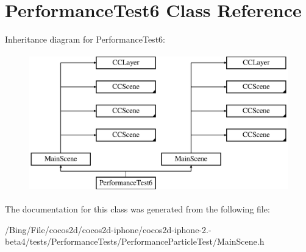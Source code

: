 \hypertarget{interface_performance_test6}{\section{Performance\-Test6 Class Reference}
\label{interface_performance_test6}
}
Inheritance diagram for Performance\-Test6\-:\begin{figure}[H]
\begin{center}
\leavevmode
\includegraphics[height=6.000000cm]{interface_performance_test6}
\end{center}
\end{figure}


The documentation for this class was generated from the following file\-:\begin{DoxyCompactItemize}
\item 
/\-Bing/\-File/cocos2d/cocos2d-\/iphone/cocos2d-\/iphone-\/2.-\/beta4/tests/\-Performance\-Tests/\-Performance\-Particle\-Test/Main\-Scene.\-h\end{DoxyCompactItemize}
